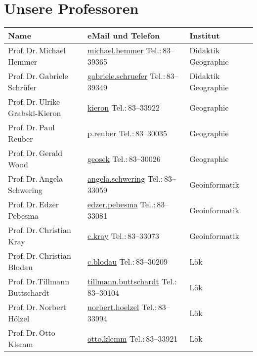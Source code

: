 \newpage

\section{Unsere Professoren}
\begin{small}
\begin{longtable}{p{} p{} p{}}
  Name & eMail und Telefon & Institut\\ \hline \hline
  Prof.\,Dr.\,Michael Hemmer & \url{michael.hemmer} \newline Tel.:\,83--39365 & Didaktik Geographie\\
  Prof.\,Dr.\,Gabriele Schrüfer & \url{gabriele.schruefer} \newline Tel.:\,83--39349 & Didaktik Geographie\\  \hline
  Prof.\,Dr.\,Ulrike Grabski-Kieron & \url{kieron} \newline Tel.:\,83--33922 & Geographie\\
  Prof.\,Dr.\,Paul Reuber & \url{p.reuber} \newline Tel.:\,83--30035 & Geographie\\
  Prof.\,Dr.\,Gerald Wood & \url{geosek} \newline Tel.:\,83--30026 & Geographie\\ \hline
  Prof.\,Dr.\,Angela Schwering & \url{angela.schwering} \newline Tel.:\,83--33059 & Geoinformatik\\
  Prof.\,Dr.\,Edzer Pebesma & \url{edzer.pebesma} \newline Tel.:\,83--33081 & Geoinformatik\\ 
  Prof.\,Dr.\,Christian Kray & \url{c.kray} \newline Tel.:\,83--33073 &  Geoinformatik \\ \hline
  Prof.\,Dr.\,Christian Blodau & \url{c.blodau} \newline Tel.:\,83--30209& Lök \\ 
  Prof.\,Dr.\newline Tillmann Buttschardt & \url{tillmann.buttschardt} \newline Tel.:\,83--30104 & Lök\\
  Prof.\,Dr.\,Norbert Hölzel & \url{norbert.hoelzel} \newline Tel.:\,83--33994 & Lök\\
  Prof.\,Dr.\,Otto Klemm & \url{otto.klemm} \newline Tel.:\,83--33921 & Lök\\

\end{longtable}
\end{small}
